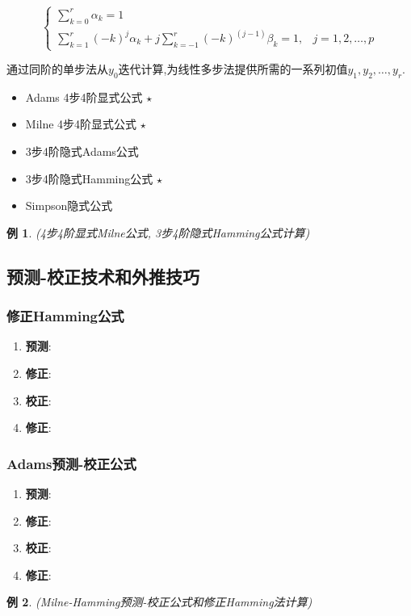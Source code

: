 \documentclass[twoside]{article}
\newtheorem{eg}{例}[section]
\begin{document}
\begin{equation}
  \begin{cases}
        \sum^r_{k=0} \alpha_k = 1 \\
        \sum^r_{k=1} {(-k)}^j \alpha_k + j \sum^r_{k=-1} { (-k) }^(j-1) \beta_k = 1,& j=1,2,\ldots,p
  \end{cases}
\end{equation}

通过同阶的单步法从$y_0$迭代计算,为线性多步法提供所需的一系列初值$y_1, y_2, \dots, y_r$.
\begin{itemize}
  \item Adams 4步4阶显式公式 $\star$
  \item Milne 4步4阶显式公式 $\star$
  \item 3步4阶隐式Adams公式
  \item 3步4阶隐式Hamming公式 $\star$
  \item Simpson隐式公式
\end{itemize}
\begin{eg}
  (4步4阶显式Milne公式, 3步4阶隐式Hamming公式计算)
\end{eg}
\subsection{预测-校正技术和外推技巧}
\subsubsection{修正Hamming公式}
    \begin{enumerate}
        \item \textbf{预测}:
        \item \textbf{修正}:
        \item \textbf{校正}:
        \item \textbf{修正}:
    \end{enumerate}

\subsubsection{Adams预测-校正公式}
    \begin{enumerate}
        \item \textbf{预测}:
        \item \textbf{修正}:
        \item \textbf{校正}:
        \item \textbf{修正}:
    \end{enumerate}
\begin{eg}
  (Milne-Hamming预测-校正公式和修正Hamming法计算)
\end{eg}
\end{document}

